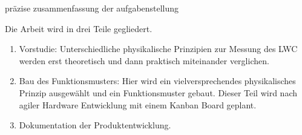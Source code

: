 präzise zusammenfassung der aufgabenstellung

Die Arbeit wird in drei Teile gegliedert.

\begin{enumerate}
\item Vorstudie: Unterschiedliche physikalische Prinzipien zur Messung des LWC werden erst theoretisch und dann praktisch miteinander verglichen.

\item Bau des Funktionsmusters:  Hier wird ein vielversprechendes physikalisches Prinzip ausgewählt und ein Funktionsmuster gebaut. Dieser Teil wird nach agiler Hardware Entwicklung mit einem Kanban Board geplant.

\item Dokumentation der Produktentwicklung.
\end{enumerate}

